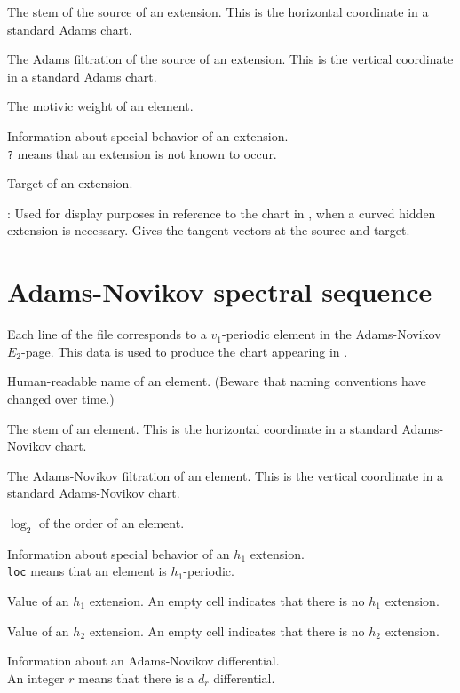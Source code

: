 \documentclass{amsart}
\begin{document}
 The stem of the source of an extension.  This is the
horizontal coordinate in a standard Adams chart.

 The Adams filtration of 
the source of an extension.  This is the vertical coordinate in a standard 
Adams chart.

 The motivic weight of an element.

 Information about special behavior of an extension. \\
\texttt{?} means that an extension is not known to occur.

 Target of an extension.

:
Used for display purposes in reference to the chart in \cite{IWX19c},
when a curved hidden extension is necessary.
Gives the tangent vectors at the source and target.

\newpage

\section{Adams-Novikov spectral sequence}

Each line of the file corresponds to a $v_1$-periodic element in the 
Adams-Novikov $E_2$-page.
This data is used to produce the chart appearing in
\cite{IWX19d}.

  Human-readable name of an element.
(Beware that naming conventions have changed over time.) 

 The stem of an element.  This is the
horizontal coordinate in a standard Adams-Novikov chart.

 The Adams-Novikov filtration of 
an element.  This is the vertical coordinate in a standard 
Adams-Novikov chart.

 $\log_2$ of the order of an element.

Information about special behavior of an $h_1$ extension. \\
\texttt{loc} means that an element is $h_1$-periodic.

Value of an $h_1$ extension.  An empty cell indicates
that there is no $h_1$ extension.

Value of an $h_2$ extension.  An empty cell indicates
that there is no $h_2$ extension.

Information about an Adams-Novikov differential. \\
An integer $r$ means that there is a $d_r$ differential.
\end{document}

